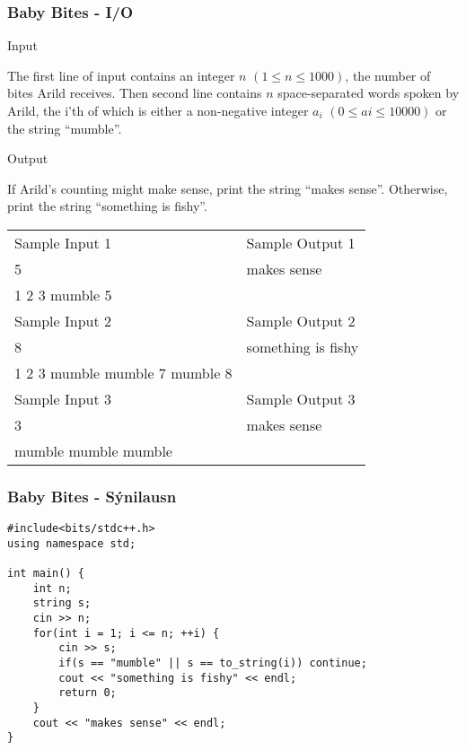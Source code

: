 \documentclass{beamer}
\begin{document}
\begin{frame}
\frametitle{Baby Bites - I/O}
\begin{large}
Input \\
\end{large}
\begin{small}
The first line of input contains an integer $n$ $(1 \leq n \leq 1000)$, the number of bites Arild receives. Then second line contains $n$ space-separated words spoken by Arild, the i’th of which is either a non-negative integer $a_i$ $(0 \leq ai \leq 10000)$ or the string “mumble”. \\
\end{small}
\begin{large}
Output \\
\end{large}
\begin{small}
If Arild’s counting might make sense, print the string “makes sense”. Otherwise, print the string “something is fishy”. \\

\begin{tabular}{ll}
Sample Input 1 & Sample Output 1 \\
5 & makes sense \\
1 2 3 mumble 5 & \\
Sample Input 2 & Sample Output 2 \\
8 & something is fishy \\
1 2 3 mumble mumble 7 mumble 8 & \\
Sample Input 3 & Sample Output 3 \\
3 & makes sense \\
mumble mumble mumble & \\
\end{tabular}
\end{small}
\end{frame}

\begin{frame}[fragile]
\frametitle{Baby Bites - Sýnilausn}
\begin{verbatim}
#include<bits/stdc++.h>
using namespace std;

int main() {
    int n;
    string s;
    cin >> n;
    for(int i = 1; i <= n; ++i) {
        cin >> s;
        if(s == "mumble" || s == to_string(i)) continue;
        cout << "something is fishy" << endl;
        return 0;
    }
    cout << "makes sense" << endl;
}
\end{verbatim}
\end{frame}
\end{document}
